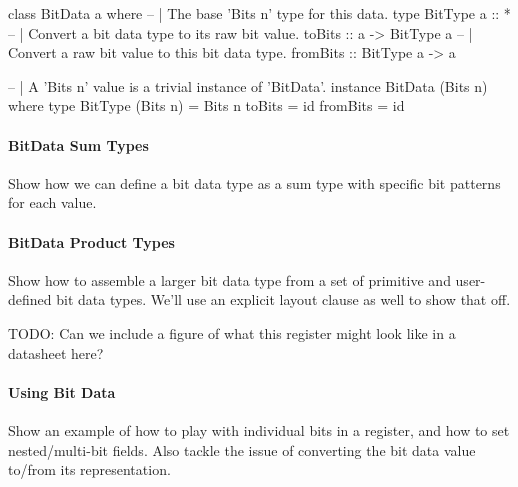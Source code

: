 \begin{code}
class BitData a where
  -- | The base 'Bits n' type for this data.
  type BitType a :: *
  -- | Convert a bit data type to its raw bit value.
  toBits :: a -> BitType a
  -- | Convert a raw bit value to this bit data type.
  fromBits :: BitType a -> a

-- | A 'Bits n' value is a trivial instance of 'BitData'.
instance BitData (Bits n) where
  type BitType (Bits n) = Bits n
  toBits   = id
  fromBits = id
\end{code}

\paragraph{BitData Sum Types}
Show how we can define a bit data type as a sum type with specific
bit patterns for each value.

\begin{code}
[ivory|
  bitdata BaudRate :: Bits 2
    = baud_9600    as 0b00
    | baud_19200   as 0b01
    | baud_38400   as 0b10
    -- bit pattern 0b11 is invalid
|]
\end{code}

\paragraph{BitData Product Types}
Show how to assemble a larger bit data type from a set of primitive
and user-defined bit data types.  We'll use an explicit layout clause
as well to show that off.

TODO: Can we include a figure of what this register might look like
in a datasheet here?


\begin{code}
[ivory|
  bitdata CtrlReg :: Bits 8 = ctrl_reg
    { ctrl_tx_enable  :: Bit
    , ctrl_rx_enable  :: Bit
    , ctrl_baud_rate  :: BaudRate
    } as 0b0000 # ctrl_tx_enable # ctrl_rx_enable
                # ctrl_baud_rate
|]
\end{code}

\paragraph{Using Bit Data}
Show an example of how to play with individual bits in a register, and how
to set nested/multi-bit fields. Also tackle the issue of converting the
bit data value to/from its representation.


